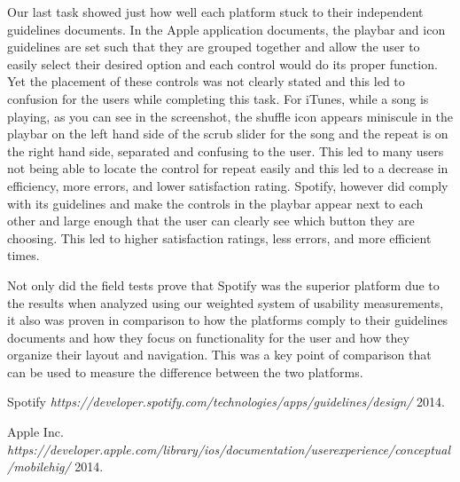 \documentclass[a4paper]{article}
\begin{document}
Our last task showed just how well each platform stuck to their independent guidelines documents. In the Apple application documents, the playbar and icon guidelines are set such that they are grouped together and allow the user to easily select their desired option and each control would do its proper function. Yet the placement of these controls was not clearly stated and this led to confusion for the users while completing this task. For iTunes, while a song is playing, as you can see in the screenshot, the shuffle icon appears miniscule in the playbar on the left hand side of the scrub slider for the song and the repeat is on the right hand side, separated and confusing to the user. This led to many users not being able to locate the control for repeat easily and this led to a decrease in efficiency, more errors, and lower satisfaction rating. Spotify, however did comply with its guidelines and make the controls in the playbar appear next to each other and large enough that the user can clearly see which button they are choosing. This led to higher satisfaction ratings, less errors, and more efficient times.

Not only did the field tests prove that Spotify was the superior platform due to the results when analyzed using our weighted system of usability measurements, it also was proven in comparison to how the platforms comply to their guidelines documents and how they focus on functionality for the user and how they organize their layout and navigation. This was a key point of comparison that can be used to measure the difference between the two platforms.


\begin{thebibliography}{1}

 Spotify {\em https://developer.spotify.com/technologies/apps/guidelines/design/}  2014.

  Apple Inc. {\em https://developer.apple.com/library/ios/documentation/userexperience/conceptual/mobilehig/}
2014.
\end{thebibliography}
\end{document}
